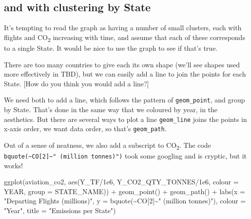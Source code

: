 \documentclass[
]{book}
\newenvironment{Shaded}{\begin{snugshade}}{\end{snugshade}}
\newcommand{\AttributeTok}[1]{\textcolor[rgb]{0.77,0.63,0.00}{#1}}
\newcommand{\DecValTok}[1]{\textcolor[rgb]{0.00,0.00,0.81}{#1}}
\newcommand{\FloatTok}[1]{\textcolor[rgb]{0.00,0.00,0.81}{#1}}
\newcommand{\FunctionTok}[1]{\textcolor[rgb]{0.00,0.00,0.00}{#1}}
\newcommand{\NormalTok}[1]{#1}
\newcommand{\SpecialCharTok}[1]{\textcolor[rgb]{0.00,0.00,0.00}{#1}}
\newcommand{\StringTok}[1]{\textcolor[rgb]{0.31,0.60,0.02}{#1}}
\begin{document}
\hypertarget{statecluster}{%
\subsection{and with clustering by State}\label{statecluster}}

It's tempting to read the graph as having a number of small clusters, each with flights and CO\textsubscript{2} increasing with time, and assume that each of these corresponds to a single State. It would be nice to use the graph to see if that's true.

There are too many countries to give each its own shape (we'll see shapes used more effectively in TBD), but we can easily add a line to join the points for each State. {[}How do you think you would add a line?{]}

We need both to add a line, which follows the pattern of \texttt{geom\_point}, and group by State. That's done in the same way that we coloured by year, in the aesthetics. But there are several ways to plot a line \texttt{geom\_line} joins the points in x-axis order, we want data order, so that's \texttt{geom\_path}.

Out of a sense of neatness, we also add a subscript to CO\textsubscript{2}. The code \texttt{bquote(\textasciitilde{}CO{[}2{]}\textasciitilde{}"\ (million\ tonnes)")} took some googling and is cryptic, but it works!

\begin{Shaded}
\begin{Highlighting}[]
\FunctionTok{ggplot}\NormalTok{(aviation\_co2, }\FunctionTok{aes}\NormalTok{(Y\_TF}\SpecialCharTok{/}\FloatTok{1e6}\NormalTok{, Y\_CO2\_QTY\_TONNES}\SpecialCharTok{/}\FloatTok{1e6}\NormalTok{, }
                         \AttributeTok{colour =}\NormalTok{ YEAR, }\AttributeTok{group =}\NormalTok{ STATE\_NAME)) }\SpecialCharTok{+}
  \FunctionTok{geom\_point}\NormalTok{() }\SpecialCharTok{+} 
  \FunctionTok{geom\_path}\NormalTok{() }\SpecialCharTok{+}
  \FunctionTok{labs}\NormalTok{(}\AttributeTok{x =} \StringTok{"Departing Flights (millions)"}\NormalTok{, }
       \AttributeTok{y =} \FunctionTok{bquote}\NormalTok{(}\SpecialCharTok{\textasciitilde{}}\NormalTok{CO[}\DecValTok{2}\NormalTok{]}\SpecialCharTok{\textasciitilde{}}\StringTok{" (million tonnes)"}\NormalTok{),}
       \AttributeTok{colour =} \StringTok{"Year"}\NormalTok{,}
       \AttributeTok{title =} \StringTok{"Emissions per State"}\NormalTok{)}
\end{Highlighting}
\end{Shaded}
\end{document}
